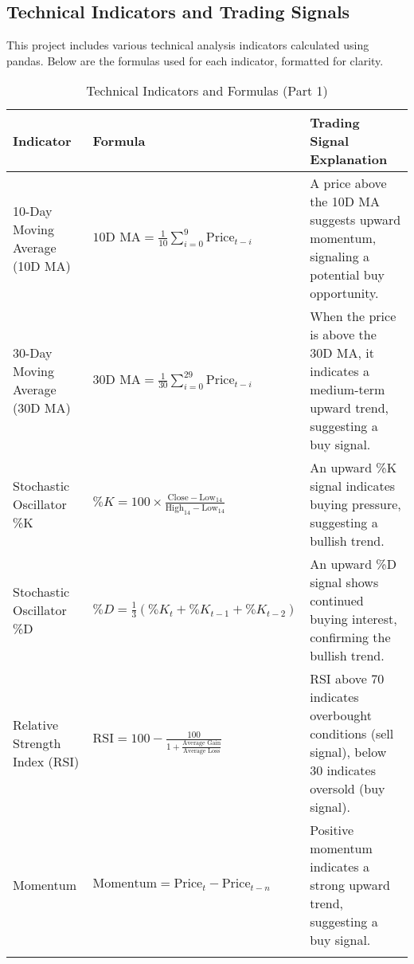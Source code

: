 \subsection{Technical Indicators and Trading Signals}
This project includes various technical analysis indicators calculated using pandas. Below are the formulas used for each indicator, formatted for clarity.

\small
\begin{longtable}{@{}p{3.5cm}p{6cm}X@{}}
\toprule
\textbf{Indicator} & \textbf{Formula} & \textbf{Trading Signal Explanation} \\ \midrule
\endhead

10-Day Moving Average (10D MA) & $\text{10D MA} = \frac{1}{10} \sum_{i=0}^{9} \text{Price}_{t-i}$ & A price above the 10D MA suggests upward momentum, signaling a potential buy opportunity. \\ \midrule
30-Day Moving Average (30D MA) & $\text{30D MA} = \frac{1}{30} \sum_{i=0}^{29} \text{Price}_{t-i}$ & When the price is above the 30D MA, it indicates a medium-term upward trend, suggesting a buy signal. \\ \midrule
Stochastic Oscillator \%K & $\%K = 100 \times \frac{\text{Close} - \text{Low}_{14}}{\text{High}_{14} - \text{Low}_{14}}$ & An upward \%K signal indicates buying pressure, suggesting a bullish trend. \\ \midrule
Stochastic Oscillator \%D & $\%D = \frac{1}{3} (\%K_{t} + \%K_{t-1} + \%K_{t-2})$ & An upward \%D signal shows continued buying interest, confirming the bullish trend. \\ \midrule
Relative Strength Index (RSI) & $\text{RSI} = 100 - \frac{100}{1 + \frac{\text{Average Gain}}{\text{Average Loss}}}$ & RSI above 70 indicates overbought conditions (sell signal), below 30 indicates oversold (buy signal). \\ \midrule
Momentum & $\text{Momentum} = \text{Price}_{t} - \text{Price}_{t-n}$ & Positive momentum indicates a strong upward trend, suggesting a buy signal. \\ \bottomrule
\caption{Technical Indicators and Formulas (Part 1)}
\end{longtable}

